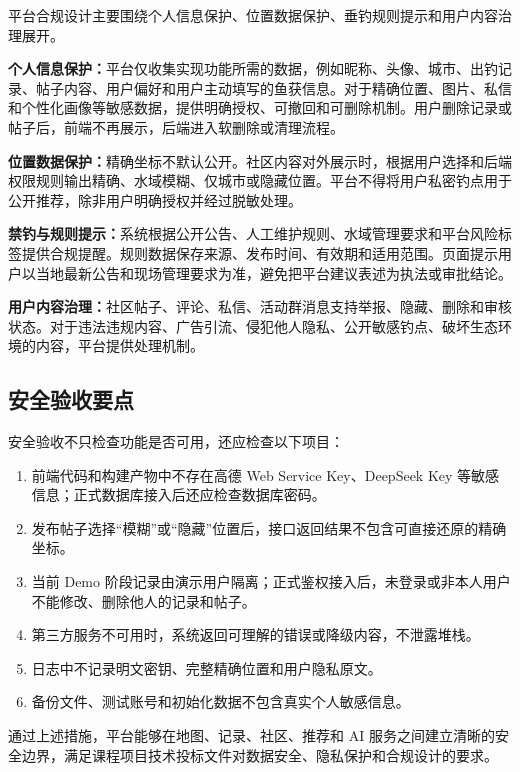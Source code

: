 平台合规设计主要围绕个人信息保护、位置数据保护、垂钓规则提示和用户内容治理展开。

\textbf{个人信息保护：}平台仅收集实现功能所需的数据，例如昵称、头像、城市、出钓记录、帖子内容、用户偏好和用户主动填写的鱼获信息。对于精确位置、图片、私信和个性化画像等敏感数据，提供明确授权、可撤回和可删除机制。用户删除记录或帖子后，前端不再展示，后端进入软删除或清理流程。

\textbf{位置数据保护：}精确坐标不默认公开。社区内容对外展示时，根据用户选择和后端权限规则输出精确、水域模糊、仅城市或隐藏位置。平台不得将用户私密钓点用于公开推荐，除非用户明确授权并经过脱敏处理。

\textbf{禁钓与规则提示：}系统根据公开公告、人工维护规则、水域管理要求和平台风险标签提供合规提醒。规则数据保存来源、发布时间、有效期和适用范围。页面提示用户以当地最新公告和现场管理要求为准，避免把平台建议表述为执法或审批结论。

\textbf{用户内容治理：}社区帖子、评论、私信、活动群消息支持举报、隐藏、删除和审核状态。对于违法违规内容、广告引流、侵犯他人隐私、公开敏感钓点、破坏生态环境的内容，平台提供处理机制。

\subsection{安全验收要点}

安全验收不只检查功能是否可用，还应检查以下项目：

\begin{enumerate}
  \item 前端代码和构建产物中不存在高德 Web Service Key、DeepSeek Key 等敏感信息；正式数据库接入后还应检查数据库密码。
  \item 发布帖子选择“模糊”或“隐藏”位置后，接口返回结果不包含可直接还原的精确坐标。
  \item 当前 Demo 阶段记录由演示用户隔离；正式鉴权接入后，未登录或非本人用户不能修改、删除他人的记录和帖子。
  \item 第三方服务不可用时，系统返回可理解的错误或降级内容，不泄露堆栈。
  \item 日志中不记录明文密钥、完整精确位置和用户隐私原文。
  \item 备份文件、测试账号和初始化数据不包含真实个人敏感信息。
\end{enumerate}

通过上述措施，平台能够在地图、记录、社区、推荐和 AI 服务之间建立清晰的安全边界，满足课程项目技术投标文件对数据安全、隐私保护和合规设计的要求。
